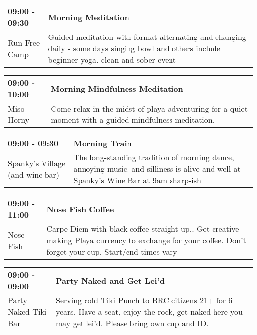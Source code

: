 \begin{tabular}{ p{1in} p{2.2in} }
    \textbf{09:00 - 09:30} & \textbf{Morning Meditation} \\
    Run Free Camp \newline  & Guided meditation with format alternating and changing daily - some days singing bowl and others include beginner yoga. clean and sober event \\
    \hline 
\end{tabular}
    
\begin{tabular}{ p{1in} p{2.2in} }
    \textbf{09:00 - 10:00} & \textbf{Morning Mindfulness Meditation} \\
    Miso Horny \newline  & Come relax in the midst of playa adventuring for a quiet moment with a guided mindfulness meditation. \\
    \hline 
\end{tabular}
    
\begin{tabular}{ p{1in} p{2.2in} }
    \textbf{09:00 - 09:30} & \textbf{Morning Train} \\
    Spanky's Village (and wine bar) \newline  & The long-standing tradition of morning dance, annoying music, and silliness is alive and well at Spanky's Wine Bar at 9am sharp-ish \\
    \hline 
\end{tabular}
    
\begin{tabular}{ p{1in} p{2.2in} }
    \textbf{09:00 - 11:00} & \textbf{Nose Fish Coffee} \\
    Nose Fish \newline  & Carpe Diem with black coffee straight up.. Get creative making Playa currency to exchange for your coffee. Don't forget your cup. Start/end times vary \\
    \hline 
\end{tabular}
    
\begin{tabular}{ p{1in} p{2.2in} }
    \textbf{09:00 - 09:00} & \textbf{Party Naked and Get Lei'd} \\
    Party Naked Tiki Bar \newline  & Serving cold Tiki Punch to BRC citizens 21+ for 6 years. Have a seat, enjoy the rock, get naked here you may get lei'd. Please bring own cup and ID. \\
    \hline 
\end{tabular}
    

